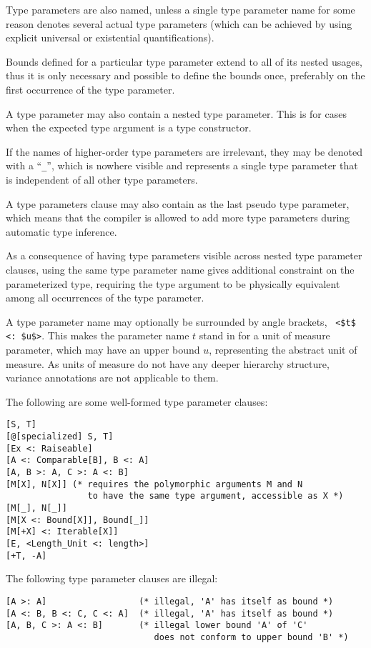 Type parameters are also named, unless a single type parameter name for some reason denotes several actual type parameters (which can be achieved by using explicit universal or existential quantifications). 

Bounds defined for a particular type parameter extend to all of its nested usages, thus it is only necessary and possible to define the bounds once, preferably on the first occurrence of the type parameter. 

A type parameter may also contain a nested type parameter. This is for cases when the expected type argument is a type constructor. 

If the names of higher-order type parameters are irrelevant, they may be denoted with a ``\lstinline!_!'', which is nowhere visible and represents a single type parameter that is independent of all other type parameters. 

A type parameters clause may also contain \code{*} as the last pseudo type parameter, which means that the compiler is allowed to add more type parameters during automatic type inference. 

As a consequence of having type parameters visible across nested type parameter clauses, using the same type parameter name gives additional constraint on the parameterized type, requiring the type argument to be physically equivalent among all occurrences of the type parameter. 

A type parameter name may optionally be surrounded by angle brackets, ~\lstinline!<$t$ <: $u$>!. This makes the parameter name $t$ stand in for a unit of measure parameter, which may have an upper bound $u$, representing the abstract unit of measure. As units of measure do not have any deeper hierarchy structure, variance annotations are not applicable to them. 

\example The following are some well-formed type parameter clauses:
\begin{lstlisting}
[S, T]
[@[specialized] S, T]
[Ex <: Raiseable]
[A <: Comparable[B], B <: A]
[A, B >: A, C >: A <: B]
[M[X], N[X]] (* requires the polymorphic arguments M and N 
                to have the same type argument, accessible as X *)
[M[_], N[_]]
[M[X <: Bound[X]], Bound[_]]
[M[+X] <: Iterable[X]]
[E, <Length_Unit <: length>]
[+T, -A]
\end{lstlisting}
The following type parameter clauses are illegal:
\begin{lstlisting}
[A >: A]                  (* illegal, 'A' has itself as bound *)
[A <: B, B <: C, C <: A]  (* illegal, 'A' has itself as bound *)
[A, B, C >: A <: B]       (* illegal lower bound 'A' of 'C'
                             does not conform to upper bound 'B' *)
\end{lstlisting}





